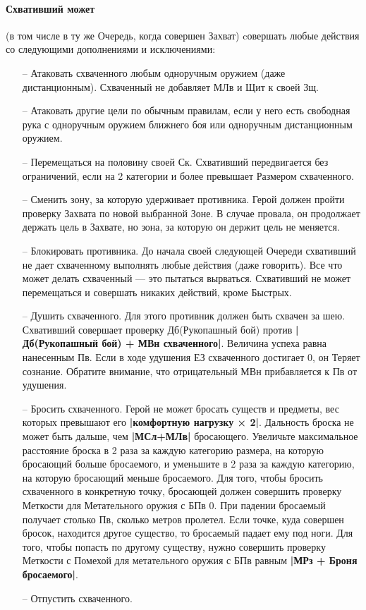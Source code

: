 \paragraph{Схвативший может} (в том числе в ту же Очередь, когда совершен Захват) cовершать любые действия со следующими дополнениями и исключениями:
\begin{itemize}
\item[--] Атаковать схваченного любым одноручным оружием (даже дистанционным). Схваченный не добавляет МЛв и Щит к своей Зщ.
\item[--] Атаковать другие цели по обычным правилам, если у него есть свободная рука с одноручным оружием ближнего боя или одноручным дистанционным оружием.
\item[--] Перемещаться на половину своей Ск. Схвативший передвигается без ограничений, если на 2 категории и более превышает Размером схваченного.
\item[--] Сменить зону, за которую удерживает противника. Герой должен пройти проверку Захвата по новой выбранной Зоне. В случае провала, он продолжает держать цель в Захвате, но зона, за которую он держит цель не меняется.
\item[--] Блокировать противника. До начала своей следующей Очереди схвативший не дает схваченному выполнять любые действия (даже говорить). Все что может делать схваченный — это пытаться вырваться. Схвативший не может перемещаться и совершать никаких действий, кроме Быстрых.
\item[--] Душить схваченного. Для этого противник должен быть схвачен за шею. Схвативший совершает проверку Дб(Рукопашный бой) против \textbf{|Дб(Рукопашный бой) + МВн схваченного|}. Величина успеха равна нанесенным Пв. Если в ходе удушения ЕЗ схваченного достигает 0, он Теряет сознание. Обратите внимание, что отрицательный МВн прибавляется к Пв от удушения.
\item[--] Бросить схваченного. Герой не может бросать существ и предметы, вес которых превышают его \textbf{|комфортную нагрузку × 2|}. Дальность броска не может быть дальше, чем \textbf{|МСл+МЛв|} бросающего. Увеличьте максимальное расстояние броска в 2 раза за каждую категорию размера, на которую бросающий больше бросаемого, и уменьшите в 2 раза за каждую категорию, на которую бросающий меньше бросаемого.
\newline Для того, чтобы бросить схваченного в конкретную точку, бросающей должен совершить проверку Меткости для Метательного оружия с БПв 0. При падении бросаемый получает столько Пв, сколько метров пролетел. Если точке, куда совершен бросок, находится другое существо, то бросаемый падает ему под ноги.
\newline Для того, чтобы попасть по другому существу, нужно совершить проверку Меткости с Помехой для метательного оружия с БПв равным \textbf{|МРз + Броня бросаемого|}.
\item[--] Отпустить схваченного.
\end{itemize}
